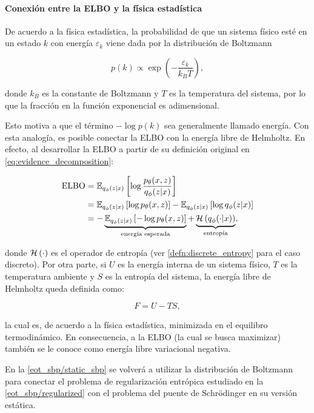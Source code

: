 \paragraph{Conexión entre la ELBO y la física estadística}

De acuerdo a la física estadística, la probabilidad de que un sistema físico esté en un estado $k$ con energía $\varepsilon_k$ viene dada por la distribución de Boltzmann

\begin{equation}
	\label{eq:boltzmann}
	p(k) \propto \exp\left(-\frac{\varepsilon_k}{k_B T}\right),
\end{equation}

donde $k_B$ es la constante de Boltzmann y $T$ es la temperatura del sistema, por lo que la fracción en la función exponencial es adimensional.

Esto motiva a que el término $-\log p(k)$ sea generalmente llamado energía. Con esta analogía, es posible conectar la ELBO con la energía libre de Helmholtz. En efecto, al desarrollar la ELBO a partir de su definición original en \eqref{eq:evidence_decomposition}:

\begin{align*}
	\operatorname{ELBO} &= \mathbb{E}_{q_\phi(z|x)}\left[\log\frac{p_\theta(x,z)}{q_\phi(z|x)}\right]\\
    & = \mathbb{E}_{q_\phi(z|x)}\left[\log p_\theta(x,z)\right] - \mathbb{E}_{q_\phi(z|x)}\left[\log q_\phi(z|x)\right] \\
	& = -\underbrace{\mathbb{E}_{q_\phi(z|x)}\left[-\log p_\theta(x,z)\right]}_{\text{energía esperada}} + \underbrace{\mathcal{H}\left(q_\phi(\cdot|x)\right)}_{\text{entropía}},
\end{align*}

donde $\mathcal{H}\left(\cdot\right)$ es el operador de entropía (ver \autoref{defn:discrete_entropy} para el caso discreto). Por otra parte, si $U$ es la energía interna de un sistema físico, $T$ es la temperatura ambiente y $S$ es la entropía del sistema, la energía libre de Helmholtz queda definida como:

\begin{equation*}
	F = U-TS,
\end{equation*}

la cual es, de acuerdo a la física estadística, minimizada en el equilibro termodinámico. En consecuencia, a la ELBO (la cual se busca maximizar) también se le conoce como energía libre variacional negativa.

En la \autoref{eot_sbp/static_sbp} se volverá a utilizar la distribución de Boltzmann para conectar el problema de regularización entrópica estudiado en la \autoref{eot_sbp/regularized} con el problema del puente de Schrödinger en su versión estática.

